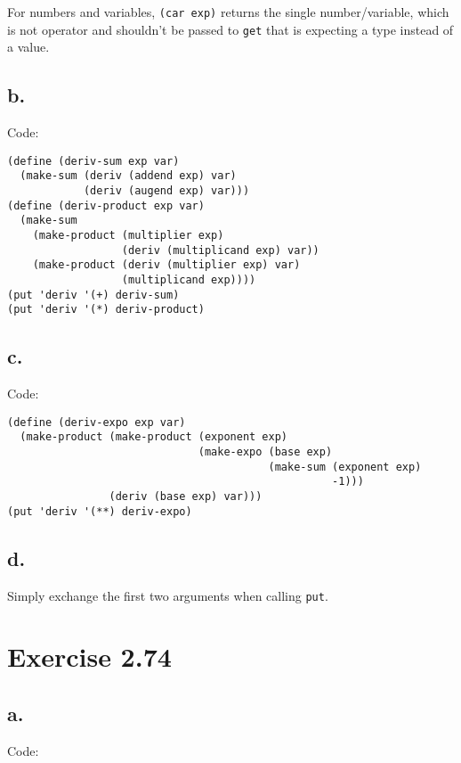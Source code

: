 \documentclass[../main.tex]{subfiles}
\begin{document}
For numbers and variables, \lstinline{(car exp)} returns
 the single number/variable, which is not operator and
 shouldn't be passed to \lstinline{get} that is expecting
 a type instead of a value.

\subsection{b.}

Code:

\begin{lstlisting}
(define (deriv-sum exp var)
  (make-sum (deriv (addend exp) var)
            (deriv (augend exp) var)))
(define (deriv-product exp var)
  (make-sum
    (make-product (multiplier exp)
                  (deriv (multiplicand exp) var))
    (make-product (deriv (multiplier exp) var)
                  (multiplicand exp))))
(put 'deriv '(+) deriv-sum)
(put 'deriv '(*) deriv-product)
\end{lstlisting}

\subsection{c.}

Code:

\begin{lstlisting}
(define (deriv-expo exp var)
  (make-product (make-product (exponent exp)
                              (make-expo (base exp)
                                         (make-sum (exponent exp)
                                                   -1)))
                (deriv (base exp) var)))
(put 'deriv '(**) deriv-expo)
\end{lstlisting}

\subsection{d.}

Simply exchange the first two arguments when calling
 \lstinline{put}.
 
\section{Exercise 2.74}

\subsection{a.}

Code:
\end{document}
